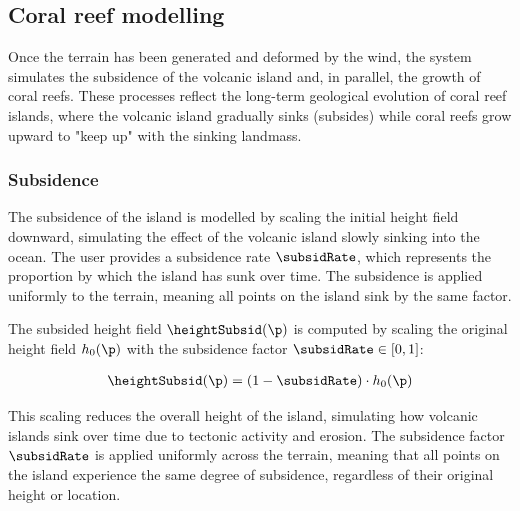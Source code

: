 \subsection{Coral reef modelling}
\label{sec:coral-island-coral-reef}


Once the terrain has been generated and deformed by the wind, the system simulates the subsidence of the volcanic island and, in parallel, the growth of coral reefs. These processes reflect the long-term geological evolution of coral reef islands, where the volcanic island gradually sinks (subsides) while coral reefs grow upward to "keep up" with the sinking landmass.

\subsubsection{Subsidence}
\label{sec:coral-island-subsidence}

The subsidence of the island is modelled by scaling the initial height field downward, simulating the effect of the volcanic island slowly sinking into the ocean. The user provides a subsidence rate $\subsidRate$, which represents the proportion by which the island has sunk over time. The subsidence is applied uniformly to the terrain, meaning all points on the island sink by the same factor.

The subsided height field $\heightSubsid(\p)$ is computed by scaling the original height field $h_0(\p)$ with the subsidence factor $\subsidRate \in [0, 1]$:

\begin{align}
\heightSubsid(\p) = (1 - \subsidRate) \cdot h_0(\p)
\end{align}

This scaling reduces the overall height of the island, simulating how volcanic islands sink over time due to tectonic activity and erosion. The subsidence factor $\subsidRate$ is applied uniformly across the terrain, meaning that all points on the island experience the same degree of subsidence, regardless of their original height or location.


